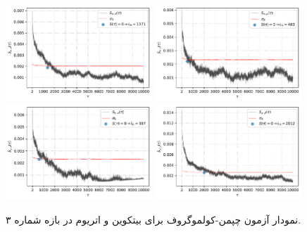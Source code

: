 \begin{figure}[H]
    \centering
    {\includegraphics[width=0.49\textwidth]{images/no3_0.pdf}}
    {\includegraphics[width=0.49\textwidth]{images/no3_1.pdf}}
    {\includegraphics[width=0.49\textwidth]{images/no3_2.pdf}}
    {\includegraphics[width=0.49\textwidth]{images/no3_3.pdf}}
    \caption{نمودار آزمون چپمن-کولموگروف برای بیتکوین و اتریوم در بازه شماره ۳.}\label{fig:ckxbteth3}
\end{figure}
